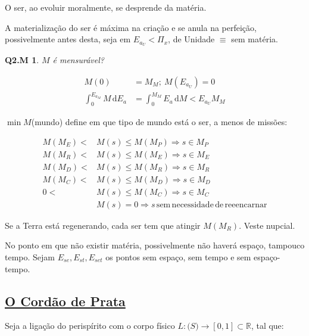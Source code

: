 \documentclass[12pt,a4paper]{article}
\begin{document}
			O ser, ao evoluir moralmente, se desprende da mat\'eria.

			A materializa\c{c}\~ao do ser \'e m\'axima na cria\c{c}\~ao e se anula na perfei\c{c}\~ao, possivelmente antes desta, seja em $ E_{a_U} < \Pi_x $, de Unidade\cite{unidade} $\equiv$ sem mat\'eria.

			\newtheorem{Q2.M}{Q2.M}
			\begin{Q2.M} $M$ \'e mensur\'avel?
			\end{Q2.M}

			\begin{align*}
				M(0) &= M_M; \
				M\left(E_{a_U}\right) = 0 \\
				\int_0^{E_{a_M}} M \,\mathrm{d}E_a &= \int_0^{M_M} E_a \,\mathrm{d}M < E_{a_U} M_M
			\end{align*}

			$\min M$(mundo) define em que tipo de mundo est\'a o ser, a menos de miss\~oes:

			\begin{align*}
				M(M_E) < &M(s) \le M(M_P) \Rightarrow s \in M_P \\
				M(M_R) < &M(s) \le M(M_E) \Rightarrow s \in M_E \\
				M(M_D) < &M(s) \le M(M_R) \Rightarrow s \in M_R \\
				M(M_C) < &M(s) \le M(M_D) \Rightarrow s \in M_D \\
				0 < &M(s) \le M(M_C) \Rightarrow s \in M_C \\
				&M(s) = 0 \Rightarrow s \mathrm{\,sem\,necessidade\,de\,reeencarnar}
			\end{align*}

			Se a Terra est\'a regenerando, cada ser tem que atingir $M(M_R)$. Veste nupcial\cite{batista}.

			No ponto em que n\~ao existir mat\'eria, possivelmente n\~ao haver\'a espa\c{c}o, tampouco tempo. Sejam $E_{se}, E_{st}, E_{set}$ os pontos sem espa\c{c}o, sem tempo e sem espa\c{c}o-tempo.

		\subsection{\underline{O Cord\~ao de Prata}}
			\begin{flushright}
			\end{flushright}

			Seja a liga\c{c}\~ao do perisp\'irito com o corpo f\'isico $L: \mathbb(S) \rightarrow [0, 1] \subset \mathbb{R}$, tal que:
\end{document}

